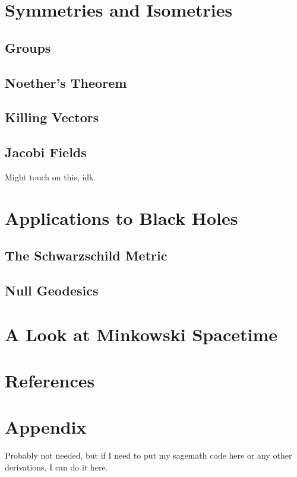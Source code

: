 \documentclass[12pt]{article}
\begin{document}
\section{Symmetries and Isometries}

\subsection{Groups}

\subsection{Noether's Theorem}

\subsection{Killing Vectors}

\subsection{Jacobi Fields}

Might touch on this, idk.

\section{Applications to Black Holes}

\subsection{The Schwarzschild Metric}

\subsection{Null Geodesics}

\section{A Look at Minkowski Spacetime}

\section{References}




\section{Appendix}

\appendix

Probably not needed, but if I need to put my sagemath code here or any other derivations, I can do it here.
\end{document}
